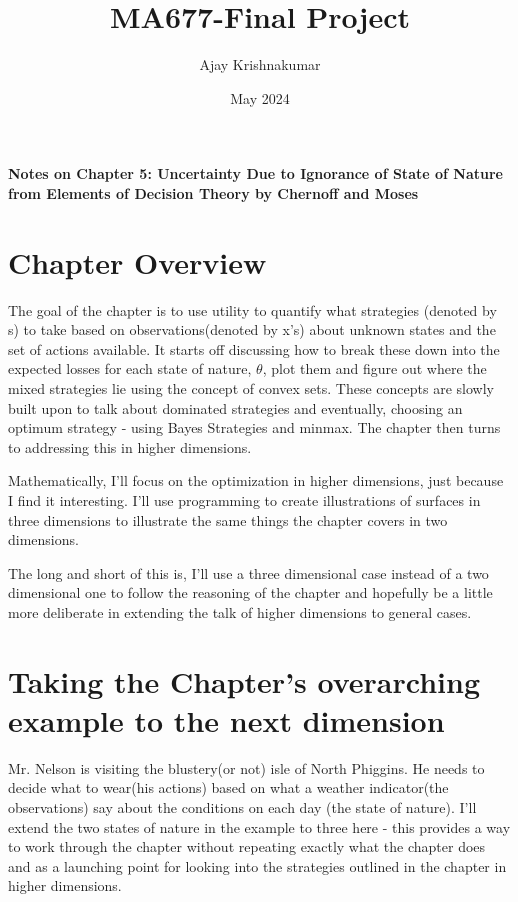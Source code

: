 \documentclass{article}
\title{MA677-Final Project}
\author{Ajay Krishnakumar }
\date{May 2024}
\begin{document}
\maketitle{}

\textbf{Notes on Chapter 5: Uncertainty Due to Ignorance of State of Nature from Elements of Decision Theory by Chernoff and Moses}



\section{Chapter Overview}

The goal of the chapter is to use utility to quantify what strategies (denoted by s) to take based on observations(denoted by x's) about unknown states and the set of actions available. It starts off discussing how to break these down into the expected losses for each state of nature, $\theta$, plot them and figure out where the mixed strategies lie using the concept of convex sets. These concepts are slowly built upon to talk about dominated strategies and eventually, choosing an optimum strategy - using Bayes Strategies and minmax. The chapter then turns to addressing this in higher dimensions. 

Mathematically, I'll focus on the optimization in higher dimensions, just because I find it interesting. I'll use programming to create illustrations of surfaces in three dimensions to illustrate the same things the chapter covers in two dimensions. 

The long and short of this is, I'll use a three dimensional case instead of a two dimensional one to follow the reasoning of the chapter and hopefully be a little more deliberate in extending the talk of higher dimensions to general cases. 

\section{Taking the Chapter's overarching example to the next dimension}
Mr. Nelson is visiting the blustery(or not) isle of North Phiggins. He needs to decide what to wear(his actions) based on what a weather indicator(the observations) say about the conditions on each day (the state of nature). I'll extend the two states of nature in the example to three here - this provides a way to work through the chapter without repeating exactly what the chapter does and as a launching point for looking into the strategies outlined in the chapter in higher dimensions.
\end{document}
